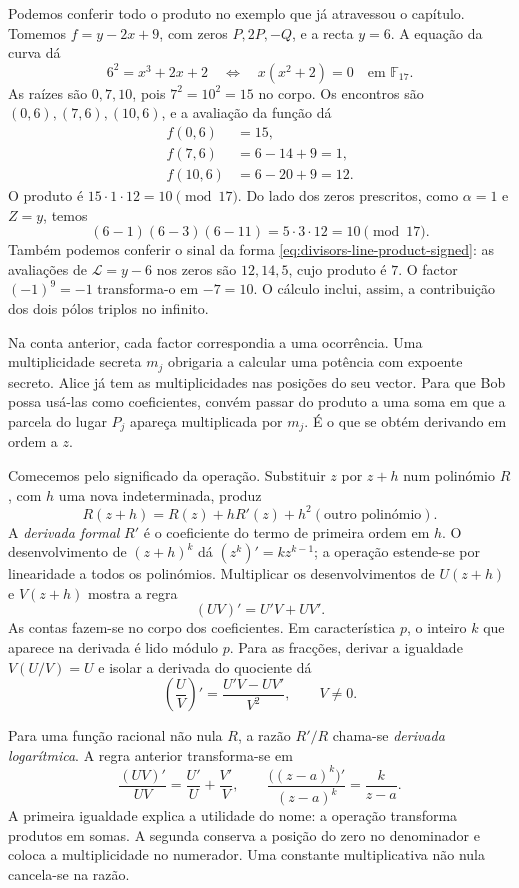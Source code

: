 Podemos conferir todo o produto no exemplo que já atravessou o
capítulo. Tomemos
\(f=y-2x+9\), com zeros \(P,2P,-Q\), e a recta \(y=6\).
A equação da curva dá
\[
 6^2=x^3+2x+2
 \quad\Longleftrightarrow\quad
 x(x^2+2)=0\quad\text{em }\mathbb F_{17}.
\]
As raízes são \(0,7,10\), pois \(7^2=10^2=15\) no corpo.
Os encontros são \((0,6),(7,6),(10,6)\), e a avaliação da função
dá
\begin{align*}
 f(0,6)&=15,\\
 f(7,6)&=6-14+9=1,\\
 f(10,6)&=6-20+9=12.
\end{align*}
O produto é \(15\cdot1\cdot12=10\pmod {17}\). Do lado
dos zeros prescritos, como \(\alpha=1\) e \(Z=y\), temos
\[
 (6-1)(6-3)(6-11)=5\cdot3\cdot12=10\pmod {17}.
\]
Também podemos conferir o sinal da forma
\eqref{eq:divisors-line-product-signed}: as avaliações de
\(\mathcal L=y-6\) nos zeros são \(12,14,5\), cujo produto
é \(7\). O factor \((-1)^9=-1\) transforma-o em
\(-7=10\). O cálculo inclui, assim, a contribuição dos dois
pólos triplos no infinito.

Na conta anterior, cada factor correspondia a uma ocorrência. Uma
multiplicidade secreta \(m_j\) obrigaria a calcular uma potência com
expoente secreto. Alice já tem as multiplicidades nas posições do seu
vector. Para que Bob possa usá-las como coeficientes, convém passar
do produto a uma soma em que a parcela do lugar \(P_j\) apareça
multiplicada por \(m_j\). É o que se obtém derivando em ordem a \(z\).

Comecemos pelo significado da operação. Substituir \(z\) por \(z+h\)
num polinómio \(R\), com \(h\) uma nova indeterminada, produz
\[
 R(z+h)=R(z)+hR'(z)+h^2(\text{outro polinómio}).
\]
A \emph{derivada formal} \(R'\) é o coeficiente do termo de primeira
ordem em \(h\). O desenvolvimento de \((z+h)^k\) dá
\((z^k)'=kz^{k-1}\); a operação estende-se por linearidade a todos
os polinómios. Multiplicar os desenvolvimentos de \(U(z+h)\) e
\(V(z+h)\) mostra a regra
\[
 (UV)'=U'V+UV'.
\]
As contas fazem-se no corpo dos coeficientes. Em característica \(p\),
o inteiro \(k\) que aparece na derivada é lido módulo \(p\).
Para as fracções, derivar a igualdade \(V(U/V)=U\) e isolar a
derivada do quociente dá
\[
 \left(\frac UV\right)'=\frac{U'V-UV'}{V^2},\qquad V\ne0.
\]

Para uma função racional não nula \(R\), a razão \(R'/R\)
chama-se \emph{derivada logarítmica}. A regra anterior transforma-se em
\[
 \frac{(UV)'}{UV}=\frac{U'}U+\frac{V'}V,
 \qquad
 \frac{\bigl((z-a)^k\bigr)'}{(z-a)^k}=\frac{k}{z-a}.
\]
A primeira igualdade explica a utilidade do nome: a operação transforma
produtos em somas. A segunda conserva a posição do zero no denominador
e coloca a multiplicidade no numerador. Uma constante multiplicativa
não nula cancela-se na razão.

